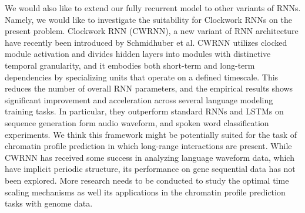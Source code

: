 \documentclass{article}
\begin{document}
\par
We would also like to extend our fully recurrent model to other variants of RNNs. Namely, we would like to investigate the suitability for Clockwork RNNs on the present problem. Clockwork RNN (CWRNN), a new variant of RNN architecture \cite{koutnik2014clockwork} have recently been introduced by Schmidhuber et al.  CWRNN utilizes clocked module activation and divides hidden layers into modules with distinctive temporal granularity, and it embodies both short-term and long-term dependencies by specializing units that operate on a defined timescale. This reduces the number of overall RNN parameters, and the empirical results shows significant improvement and acceleration across several language modeling training tasks.  In particular, they outperform standard RNNs and LSTMs on sequence generation form audio waveform, and spoken word classification experiments. We think this framework might be potentially suited for the task of chromatin profile prediction in which long-range interactions are present. While CWRNN has received some success in analyzing language waveform data, which have implicit periodic structure, its performance on gene sequential data has not been explored. More research needs to be conducted to study the optimal time scaling mechanisms as well its applications in the chromatin profile prediction tasks with genome data.

\end{document}
